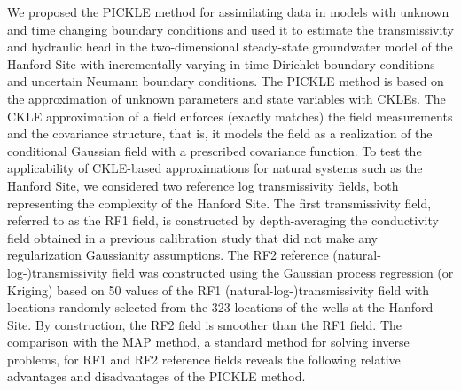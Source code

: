 \documentclass{agujournal2019}
\begin{document}
We proposed the PICKLE method for assimilating data in models with unknown and time changing boundary conditions and used it to estimate the transmissivity and hydraulic head in the two-dimensional steady-state groundwater model of the Hanford Site with incrementally varying-in-time Dirichlet boundary conditions and uncertain Neumann boundary conditions.
The PICKLE method is based on the approximation of unknown parameters and state variables with CKLEs. The CKLE approximation of a field enforces (exactly matches) the field measurements and the covariance structure, that is, it models the field as a realization of the conditional Gaussian field with a prescribed covariance function. 
To test the applicability of CKLE-based approximations for natural systems such as the Hanford Site, we considered two reference log transmissivity fields, both representing the complexity of the Hanford Site.
The first transmissivity field, referred to as the RF1 field, is constructed by depth-averaging the conductivity field obtained in a previous calibration study that did not make any regularization Gaussianity assumptions.
The RF2 reference (natural-log-)transmissivity field was constructed using the Gaussian process regression (or Kriging) based on 50 values of the RF1 (natural-log-)transmissivity field with locations randomly selected from the 323 locations of the wells at the Hanford Site.
By construction, the RF2 field is smoother than the RF1 field. 
The comparison with the MAP method, a standard method for solving inverse problems, for RF1 and RF2 reference fields reveals the following relative advantages and disadvantages of the PICKLE method.
\end{document}
